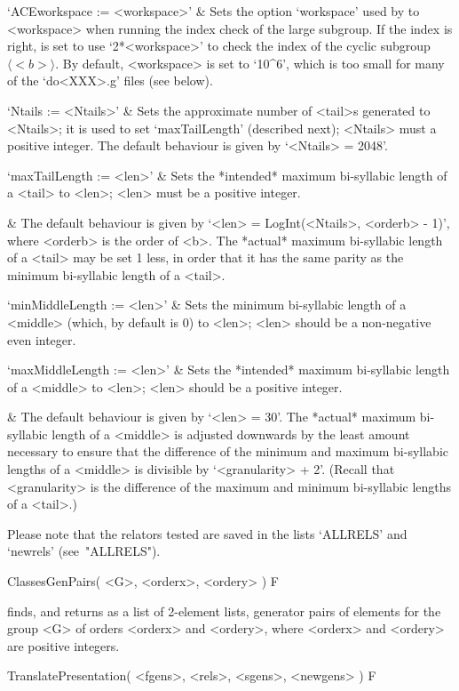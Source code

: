 \quad`ACEworkspace := <workspace>' & 
Sets the option `workspace' used by {\ACE} to <workspace> when running
the index check of the large subgroup. If the index is  right,  {\ACE}
is set to use  `2*<workspace>'  to  check  the  index  of  the  cyclic
subgroup $\langle <b> \rangle$. By  default,  <workspace>  is  set  to
`10^6', which is too small for many  of  the  `do<XXX>.g'  files  (see
below).

\quad`Ntails := <Ntails>' & 
Sets the approximate number of <tail>s generated to  <Ntails>;  it  is
used to set `maxTailLength' (described next); <Ntails> must a positive
integer. The default behaviour is given by `<Ntails> = 2048'.

\quad`maxTailLength := <len>' & 
Sets the *intended* maximum bi-syllabic length of a <tail>  to  <len>;
<len> must be a positive integer.

&
The default behaviour is given by `<len> = LogInt(<Ntails>, <orderb> -
1)', where  <orderb>  is  the  order  of  <b>.  The  *actual*  maximum
bi-syllabic length of a <tail> may be set 1 less, in order that it has
the same parity as the minimum bi-syllabic length of a <tail>.

\quad`minMiddleLength := <len>' & 
Sets the minimum bi-syllabic length of a <middle> (which,  by  default
is 0) to <len>; <len> should be a non-negative even integer.

\quad`maxMiddleLength := <len>' & 
Sets the *intended* maximum bi-syllabic length of a <middle> to <len>;
<len> should be a positive integer.

&
The default behaviour is given by `<len> = 30'. The  *actual*  maximum
bi-syllabic length of a <middle> is adjusted downwards  by  the  least
amount necessary to ensure that the  difference  of  the  minimum  and
maximum  bi-syllabic lengths  of   a   <middle>   is   divisible   by
`<granularity> + 2'. (Recall that <granularity> is the  difference  of
the maximum and minimum bi-syllabic lengths of a <tail>.)

\enditems

Please note that the relators tested are saved in the lists  `ALLRELS'
and `newrels' (see~"ALLRELS").

\>ClassesGenPairs( <G>, <orderx>, <ordery> ) F

finds, and returns as a list of 2-element lists,  generator  pairs  of
elements for the group <G> of  orders  <orderx>  and  <ordery>,  where
<orderx> and <ordery> are positive integers.

\>TranslatePresentation( <fgens>, <rels>, <sgens>, <newgens> ) F

